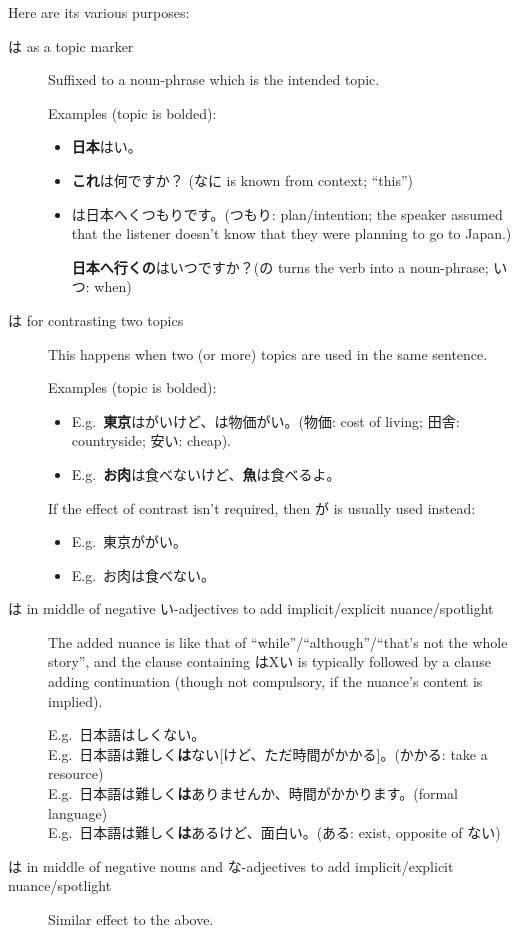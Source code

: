 \documentclass[../nihongo-gakushuu-kyouzai.tex]{subfiles}
\begin{document}
Here are its various purposes:
\begin{description}
    \item[は as a topic marker] Suffixed to a noun-phrase which is the intended topic.

    Examples (topic is bolded):
    \begin{itemize}
        \item \textbf{日本}はい。
        \item \textbf{これ}は何ですか？ (なに is known from context; ``this'')
        \item \textbf{}は日本へくつもりです。(つもり: plan/intention; the speaker assumed that the listener doesn't know that they were planning to go to Japan.)

        \textbf{日本へ行くの}はいつですか？(の turns the verb into a noun-phrase; いつ: when)
    \end{itemize}
    \item[は for contrasting two topics] This happens when two (or more) topics are used in the same sentence.

    Examples (topic is bolded):
    \begin{itemize}
        \item E.g.\ \textbf{東京}はがいけど、\textbf{}は物価がい。(物価: cost of living; 田舎: countryside; 安い: cheap).
        \item E.g.\ \textbf{お肉}は食べないけど、\textbf{魚}は食べるよ。
    \end{itemize}

    If the effect of contrast isn't required, then が is usually used instead:

    \begin{itemize}
        \item E.g.\ 東京ががい。
        \item E.g.\ お肉は食べない。
    \end{itemize}

    \item[は in middle of negative い-adjectives to add implicit/explicit nuance/spotlight] The added nuance is like that of ``while''/``although''/``that's not the whole story'', and the clause containing はXい is typically followed by a clause adding continuation (though not compulsory, if the nuance's content is implied).

    E.g.\ 日本語はしくない。\\
    E.g.\ 日本語は難しく\textbf{は}ない[けど、ただ時間がかかる]。(かかる: take a resource) \\
    E.g.\ 日本語は難しく\textbf{は}ありませんか、時間がかかります。(formal language)\\
    E.g.\ 日本語は難しく\textbf{は}あるけど、面白い。(ある: exist, opposite of ない)
    \item[は in middle of negative nouns and な-adjectives to add implicit/explicit nuance/spotlight] Similar effect to the above.


\end{description}
\end{document}
